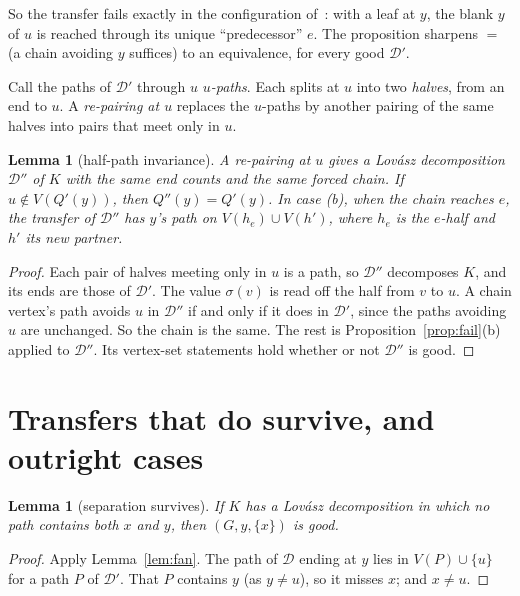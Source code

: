 \documentclass[11pt]{amsart}
\newtheorem{lemma}[theorem]{Lemma}
\theoremstyle{definition}
\newcommand{\cD}{\mathcal D}
\newcommand{\lean}[1]{\quad{\footnotesize[Lean: \texttt{#1}]}}
\begin{document}
So the transfer fails exactly in the configuration of~\cite[Cor.~2.3]{TF}: with a leaf at $y$, the
blank $y$ of $u$ is reached through its unique ``predecessor'' $e$. The proposition sharpens
\cite[Lemma~3.2]{TF} $=$ \cite[Lemma~2.2]{L1I} (a chain avoiding $y$ suffices) to an equivalence,
for every good $\cD'$.

Call the paths of $\cD'$ through $u$ \emph{$u$-paths}. Each splits at $u$ into two \emph{halves},
from an end to $u$. A \emph{re-pairing at $u$} replaces the $u$-paths by another pairing of the same
halves into pairs that meet only in $u$.

\begin{lemma}[half-path invariance]\label{lem:halves}
A re-pairing at $u$ gives a Lov\'asz decomposition $\cD''$ of $K$ with the same end counts and
the same forced chain. If $u\notin V(Q'(y))$, then $Q''(y)=Q'(y)$. In case (b), when the chain
reaches $e$, the transfer of $\cD''$ has $y$'s path on $V(h_e)\cup V(h')$, where $h_e$ is the
$e$-half and $h'$ its new partner.
\end{lemma}

\begin{proof}
Each pair of halves meeting only in $u$ is a path, so $\cD''$ decomposes $K$, and its ends are those
of $\cD'$. The value $\sigma(v)$ is read off the half from $v$ to $u$. A chain vertex's path avoids
$u$ in $\cD''$ if and only if it does in $\cD'$, since the paths avoiding $u$ are unchanged. So the
chain is the same. The rest is Proposition~\ref{prop:fail}(b) applied to $\cD''$. Its vertex-set
statements hold whether or not $\cD''$ is good.
\end{proof}

\section{Transfers that do survive, and outright cases}\label{sec:tools}

\begin{lemma}[separation survives]\label{lem:sep}
If $K$ has a Lov\'asz decomposition in which no path contains both $x$ and $y$, then $(G,y,\{x\})$
is good.\lean{avoid\_of\_separating\_child}
\end{lemma}

\begin{proof}
Apply Lemma~\ref{lem:fan}. The path of $\cD$ ending at $y$ lies in $V(P)\cup\{u\}$ for a path $P$
of $\cD'$. That $P$ contains $y$ (as $y\ne u$), so it misses $x$; and $x\ne u$.
\end{proof}
\end{document}

